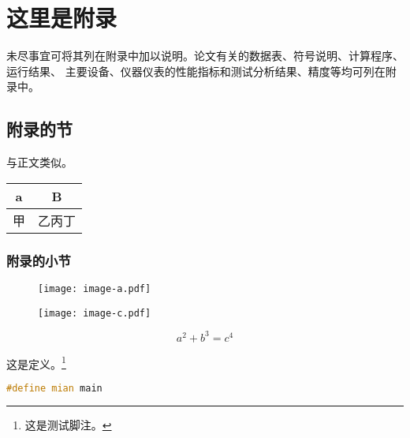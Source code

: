 \chapter{这里是附录}\label{app:1}
未尽事宜可将其列在附录中加以说明。论文有关的数据表、符号说明、计算程序、运行结果、
主要设备、仪器仪表的性能指标和测试分析结果、精度等均可列在附录中。
\section{附录的节}
与正文类似。
\begin{table}[ht]
	\centering
	\label{tab:mytable}
	\begin{tabular}{cc}
		\toprule
		a & B   \\
		\midrule
		甲   & 乙丙丁 \\
		\bottomrule
	\end{tabular}
\end{table}

\subsection{附录的小节}
\zhlipsum[1][name = zhufu]

\begin{figure}[ht]
	\centering
	\begin{minipage}{0.4\textwidth}
		\centering
		\texttt{[image: image-a.pdf]}
		\label{fig:test1}
	\end{minipage}
	\hspace{1cm}
	\begin{minipage}{0.4\textwidth}
		\centering
		\texttt{[image: image-c.pdf]}
		\label{fig:test2}
	\end{minipage}
\end{figure}

\zhlipsum[name = xiangyu]

\zhlipsum[1][name = aspirin]

\begin{equation}
	a^2+b^3=c^4
\end{equation}

\begin{definition}
	这是定义。\footnote{这是测试脚注。}
\end{definition}

\begin{lstlisting}[language=c++,caption=一个测试,label=mycode]
#define mian main
	\end{lstlisting}

